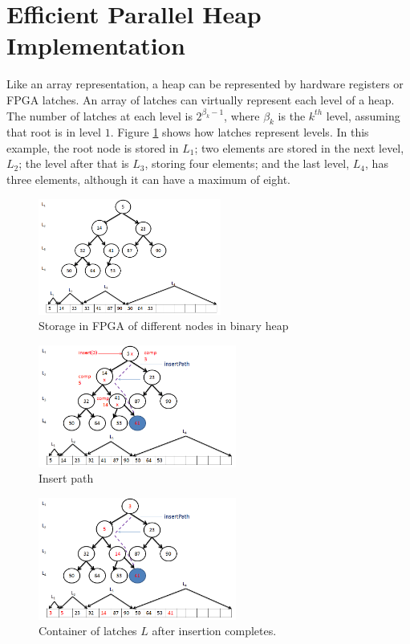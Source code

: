 \section{Efficient Parallel Heap Implementation}
\label{s:impl}

Like an array representation, a heap can be represented by hardware registers or FPGA latches.
An array of latches can virtually represent each level of a heap.
The number of latches at each level is $2^{\beta_k-1}$, where $\beta_k$ is the $k^{th}$ level, assuming that root is in level $1$.
Figure \ref{fig5} shows how latches represent levels.
In this example, the root node is stored in $L_1$; two elements are stored in the next level, $L_2$; the level after that is $L_3$, storing four elements; and the last level, $L_4$, has three elements, although it can have a maximum of eight.

\begin{figure}[!ht]
  \centering
  \includegraphics[width=6cm]{fig/5.png}
      \caption{Storage in FPGA of different nodes in binary heap}
    \label{fig5}
\end{figure}

\begin{figure}[!ht]
  \centering
  \includegraphics[width=6.5cm]{fig/6.png}
      \caption{Insert path}
    \label{fig6}
\end{figure}

\begin{figure}[!ht]
  \centering
  \includegraphics[width=6.5cm]{fig/7.png}
      \caption{Container of latches $L$ after insertion completes.}
    \label{fig7}
\end{figure}

